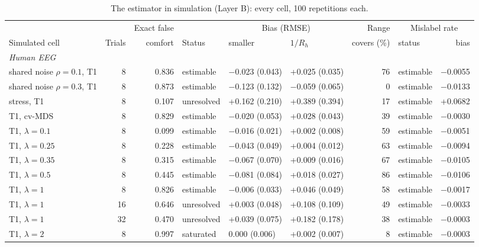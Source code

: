\documentclass[11pt]{article}
\begin{document}
\begin{table}[!htb]
\centering\scriptsize
\caption{The estimator in simulation (Layer B): every cell, 100 repetitions each.}
\setlength{\tabcolsep}{2.5pt}\renewcommand{\arraystretch}{0.94}
\begin{tabular}{lrrlllrlr}
\toprule
 & & Exact false & & \multicolumn{2}{c}{Bias (RMSE)} & Range & \multicolumn{2}{c}{Mislabel rate} \\
\cmidrule(lr){5-6}\cmidrule(lr){8-9}
Simulated cell & Trials & comfort & Status & smaller & $1/R_h$ & covers (\%) & status & bias \\
\midrule
\multicolumn{9}{l}{\textit{Human EEG}} \\
\quad shared noise $\rho=0.1$, T1 & 8 & 0.836 & estimable & $-$0.023 (0.043) & +0.025 (0.035) & 76 & estimable & $-$0.0055 \\
\quad shared noise $\rho=0.3$, T1 & 8 & 0.873 & estimable & $-$0.123 (0.132) & $-$0.059 (0.065) & 0 & estimable & $-$0.0133 \\
\quad stress, T1 & 8 & 0.107 & unresolved & +0.162 (0.210) & +0.389 (0.394) & 17 & estimable & +0.0682 \\
\quad T1, cv-MDS & 8 & 0.829 & estimable & $-$0.020 (0.053) & +0.028 (0.043) & 39 & estimable & $-$0.0030 \\
\quad T1, $\lambda=0.1$ & 8 & 0.099 & estimable & $-$0.016 (0.021) & +0.002 (0.008) & 59 & estimable & $-$0.0051 \\
\quad T1, $\lambda=0.25$ & 8 & 0.228 & estimable & $-$0.043 (0.049) & +0.004 (0.012) & 63 & estimable & $-$0.0094 \\
\quad T1, $\lambda=0.35$ & 8 & 0.315 & estimable & $-$0.067 (0.070) & +0.009 (0.016) & 67 & estimable & $-$0.0105 \\
\quad T1, $\lambda=0.5$ & 8 & 0.445 & estimable & $-$0.081 (0.084) & +0.018 (0.027) & 86 & estimable & $-$0.0106 \\
\quad T1, $\lambda=1$ & 8 & 0.826 & estimable & $-$0.006 (0.033) & +0.046 (0.049) & 58 & estimable & $-$0.0017 \\
\quad T1, $\lambda=1$ & 16 & 0.646 & unresolved & +0.003 (0.048) & +0.108 (0.109) & 49 & estimable & $-$0.0033 \\
\quad T1, $\lambda=1$ & 32 & 0.470 & unresolved & +0.039 (0.075) & +0.182 (0.178) & 38 & estimable & $-$0.0003 \\
\quad T1, $\lambda=2$ & 8 & 0.997 & saturated & 0.000 (0.006) & +0.002 (0.007) & 8 & estimable & $-$0.0003 \\

\end{tabular}
\end{table}
\end{document}
